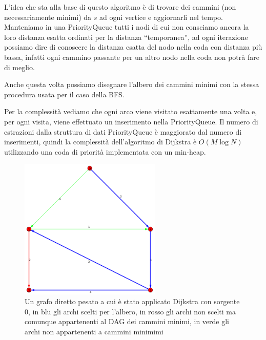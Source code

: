 \documentclass[a4paper,10pt]{amsbook}
\theoremstyle{plain}
\theoremstyle{definition}
\theoremstyle{remark}
\begin{document}
\begin{figure}[H]
  \begin{algorithmic}
     
    \EndFor
        
     
      
      
    \EndIf
    \EndFor
    \EndWhile
  \end{algorithmic}
\end{figure}
L'idea che sta alla base di questo algoritmo \`e di trovare dei
cammini (non necessariamente minimi) da $s$ ad ogni vertice e
aggiornarli nel tempo. Manteniamo in una PriorityQueue tutti i
nodi di cui non consciamo ancora la loro distanza esatta ordinati per
la distanza ``temporanea'', ad ogni iterazione possiamo dire di
conoscere la distanza esatta del nodo nella coda con distanza pi\`u
bassa, infatti ogni cammino passante per un altro nodo nella coda non
potr\`a fare di meglio.


Anche questa volta possiamo disegnare l'albero dei cammini minimi con
la stessa procedura usata per il caso della BFS.

Per la complessit\`a vediamo che ogni arco viene visitato esattamente
una volta e, per ogni visita, viene effettuato un inserimento nella
PriorityQueue. Il numero di estrazioni dalla struttura di dati
PriorityQueue \`e maggiorato dal numero di inserimenti, quindi la
complessit\`a dell'algoritmo di Dijkstra \`e $O(M\log N)$ utilizzando
una coda di priorit\`a implementata con un min-heap.

\begin{figure}[h]
  \centering
  \includegraphics[width=0.6\textwidth]{dijkstra}
  \caption{Un grafo diretto pesato a cui è stato applicato Dijkstra
    con sorgente $0$, in blu gli archi scelti per l'albero, in rosso gli
    archi non scelti ma comunque appartenenti al DAG dei cammini
    minimi, in verde gli archi non appartenenti a cammini minimimi}
  \label{fig:dijkstra}
\end{figure}
\end{document}
